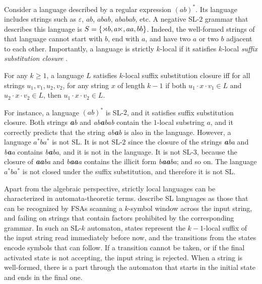 Consider a language described by a regular expression $(ab)^{*}$.
Its language includes strings such as $\varepsilon$, $ab$, $abab$, $ababab$, etc.
A negative SL-$2$ grammar that describes this language is $S = \{\rtimes b, a\ltimes, aa, bb\}$.
Indeed, the well-formed strings of that language cannot start with $b$, end with $a$, and have two $a$ or two $b$ adjacent to each other.
Importantly, a language is strictly $k$-local if it satisfies $k$-local \emph{suffix substitution closure} \citep{RogersPullum2011}.

\begin{definition}
\label{suffsubclosure}
For any $k \geq 1$, a language $L$ satisfies  $k$-local suffix substitution closure iff for all strings $u_1, v_1, u_2, v_2$, for any string $x$ of length $k - 1$ if both $u_1 \cdot x \cdot v_1 \in L$ and $u_2 \cdot x \cdot v_2 \in L$, then $u_1 \cdot x \cdot v_2 \in L$.
\end{definition}

For instance, a language $(ab)^*$ is SL-$2$, and it satisfies suffix substitution closure.
Both strings \emph{\textbf{a}b} and \emph{ab\textbf{a}bab} contain the $1$-local substring $a$, and it correctly predicts that the string \emph{ab\textbf{a}b} is also in the language.
However, a language $a^*ba^*$ is not SL.
It is not SL-$2$ since the closure of the strings \emph{\textbf{a}ba} and  \emph{b\textbf{a}a} contains \emph{b\textbf{a}ba}, and it is not in the language.
It is not SL-$3$, because the closure of \emph{\textbf{aa}ba} and \emph{b\textbf{aa}a} contains the illicit form \emph{b\textbf{aa}ba}; and so on.
The language $a^*ba^*$ is not closed under the suffix substitution, and therefore it is not SL.

Apart from the algebraic perspective, strictly local languages can be characterized in automata-theoretic terms.
\cite{RogersPullum2011} describe SL languages as those that can be recognized by FSAs scanning a $k$-symbol window across the input string, and failing on strings that contain factors prohibited by the corresponding grammar.
In such an SL-$k$ automaton, states represent the $k-1$-local suffix of the input string read immediately before now, and the transitions from the states encode symbols that can follow.
If a transition cannot be taken, or if the final activated state is not accepting, the input string is rejected.
When a string is well-formed, there is a part through the automaton that starts in the initial state and ends in the final one.



